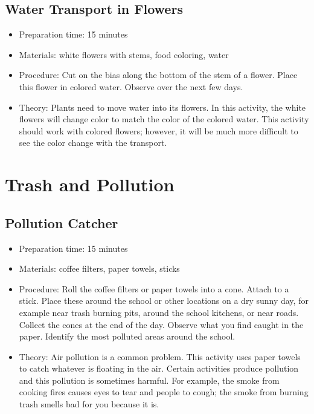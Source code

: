 \subsection{Water Transport in Flowers}
\begin{itemize}
\item{Preparation time: 15 minutes}
\item{Materials: white flowers with stems, food coloring, water}
\item{Procedure: Cut on the bias along the bottom of the stem of a flower. Place this flower in colored water. Observe over the next few days.}
\item{Theory: Plants need to move water into its flowers. In this activity, the white flowers will change color to match the color of the colored water. This activity should work with colored flowers; however, it will be much more difficult to see the color change with the transport.}
\end{itemize}

\section{Trash and Pollution}
\subsection{Pollution Catcher}
\begin{itemize}
\item{Preparation time: 15 minutes}
\item{Materials: coffee filters, paper towels, sticks}
\item{Procedure: Roll the coffee filters or paper towels into a cone. Attach to a stick. Place these around the school or other locations on a dry sunny day, for example near trash burning pits, around the school kitchens, or near roads. Collect the cones at the end of the day. Observe what you find caught in the paper. Identify the most polluted areas around the school.}
\item{Theory: Air pollution is a common problem. This activity uses paper towels to catch whatever is floating in the air. Certain activities produce pollution and this pollution is sometimes harmful. For example, the smoke from cooking fires causes eyes to tear and people to cough; the smoke from burning trash smells bad for you because it is.}
\end{itemize}

